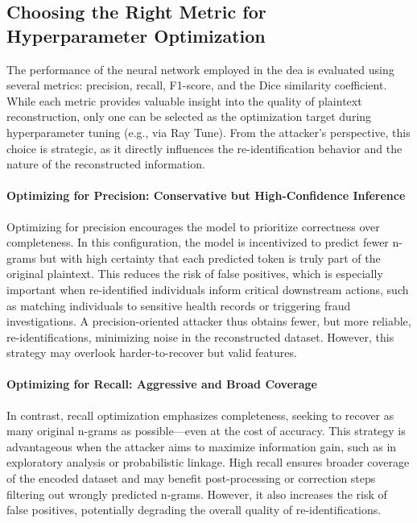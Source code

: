 \subsection{Choosing the Right Metric for Hyperparameter Optimization} \label{sec:choosingmetric}


The performance of the neural network employed in the \ac{dea} is evaluated using several metrics: precision, recall, F1-score, and the Dice similarity coefficient.
While each metric provides valuable insight into the quality of plaintext reconstruction, only one can be selected as the optimization target during hyperparameter tuning (e.g., via Ray Tune).
From the attacker's perspective, this choice is strategic, as it directly influences the re-identification behavior and the nature of the reconstructed information.

\paragraph{Optimizing for Precision: Conservative but High-Confidence Inference}

Optimizing for precision encourages the model to prioritize correctness over completeness.
In this configuration, the model is incentivized to predict fewer n-grams but with high certainty that each predicted token is truly part of the original plaintext.
This reduces the risk of false positives, which is especially important when re-identified individuals inform critical downstream actions, such as matching individuals to sensitive health records or triggering fraud investigations.
A precision-oriented attacker thus obtains fewer, but more reliable, re-identifications, minimizing noise in the reconstructed dataset.
However, this strategy may overlook harder-to-recover but valid features.

\paragraph{Optimizing for Recall: Aggressive and Broad Coverage}

In contrast, recall optimization emphasizes completeness, seeking to recover as many original n-grams as possible—even at the cost of accuracy.
This strategy is advantageous when the attacker aims to maximize information gain, such as in exploratory analysis or probabilistic linkage.
High recall ensures broader coverage of the encoded dataset and may benefit post-processing or correction steps filtering out wrongly predicted n-grams.
However, it also increases the risk of false positives, potentially degrading the overall quality of re-identifications.

